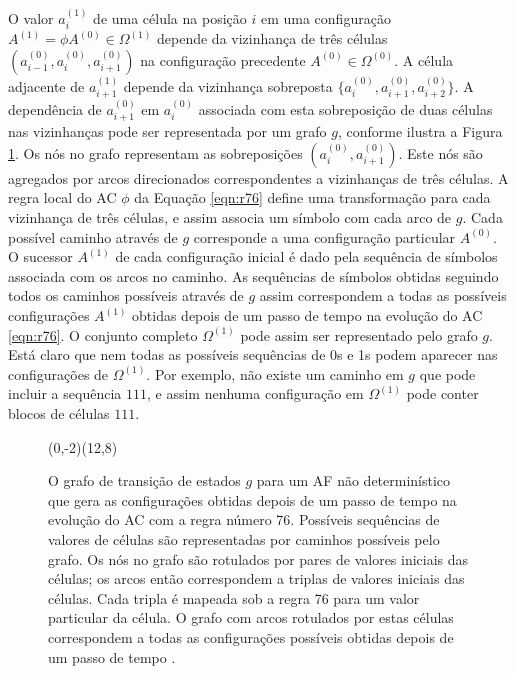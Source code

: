 \documentclass[12pt,a4paper]{article}
\let\vState=\origState
\begin{document}
O valor $a_i^{(1)}$ de uma célula na posição $i$ em uma configuração
$A^{(1)} = \phi A^{(0)} \in \Omega^{(1)}$ depende da vizinhança de três
células $(a_{i-1}^{(0)},a_i^{(0)},a_{i+1}^{(0)})$ na configuração precedente
$A^{(0)} \in \Omega^{(0)}$. A célula adjacente de $a_{i+1}^{(1)}$ depende da
vizinhança sobreposta $\{a_i^{(0)},a_{i+1}^{(0)},a_{i+2}^{(0)}\}$. A
dependência de $a_{i+1}^{(0)}$ em $a_i^{(0)}$ associada com esta sobreposição
de duas células nas vizinhanças pode ser representada por um grafo $g$, conforme
ilustra a Figura \ref{fig:A1}. Os nós no grafo representam as sobreposições
$(a_i^{(0)},a_{i+1}^{(0)})$. Este nós são agregados por arcos direcionados
correspondentes a vizinhanças de três células. A regra local do AC
$\phi$ da Equação \ref{eqn:r76} define uma transformação para cada
vizinhança de três células, e assim associa um símbolo com cada arco de $g$.
Cada possível caminho através de $g$ corresponde a uma configuração particular
$A^{(0)}$. O sucessor $A^{(1)}$ de cada configuração inicial é dado pela
sequência de símbolos associada com os arcos no caminho. As sequências de
símbolos obtidas seguindo todos os caminhos possíveis através de $g$ assim
correspondem a todas as possíveis configurações $A^{(1)}$ obtidas depois
de um passo de tempo na evolução do AC \ref{eqn:r76}. O
conjunto completo $\Omega^{(1)}$ pode assim ser representado pelo grafo
$g$. Está claro que nem todas as possíveis sequências de 0s e 1s podem
aparecer nas configurações de $\Omega^{(1)}$. Por exemplo, não existe um
caminho em $g$ que pode incluir a sequência $111$, e assim nenhuma
configuração em $\Omega^{(1)}$ pode conter blocos de células $111$.

\begin{figure}[htp]
\begin{center}
\begin{VCPicture}{(0,-2)(12,8)}
\vState[00]{(0,3)}{A} \vState[01]{(6,6)}{B}
\vState[10]{(6,0)}{C} \vState[11]{(12,3)}{D}
 
 
 
 
\end{VCPicture}
\caption{O grafo de transição de estados $g$ para um AF
não determinístico que gera as configurações obtidas depois de um passo
de tempo na evolução do AC com a regra número 76.
Possíveis sequências de valores de células são representadas por
caminhos possíveis pelo grafo. Os nós no grafo são rotulados por pares
de valores iniciais das células; os arcos então correspondem a triplas
de valores iniciais das células. Cada tripla é mapeada sob a regra 76
para um valor particular da célula. O grafo com arcos rotulados por estas
células correspondem a todas as configurações possíveis obtidas depois
de um passo de tempo .}
\label{fig:A1}
\end{center}
\end{figure}
\end{document}
